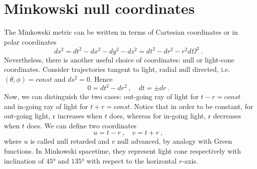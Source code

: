 \section{Minkowski null coordinates}

    The Minkowski metric can be written in terms of Cartesian coordinates or in polar coordinates 
    \begin{equation*}
        ds^2 = dt^2 - dx^2 - dy^2 - dz^2 = dt^2 - dr^2 - r^2 d\Omega^2 ~.
    \end{equation*}
    Nevertheless, there is another useful choice of coordinates: null or light-cone coordinates. Consider trajectories tangent to light, radial null directed, i.e.~$(\theta, \phi) = const$ and $ds^2 = 0$. Hence 
    \begin{equation*}
        0 = dt^2 - dr^2 ~, \quad dt = \pm dr ~.
    \end{equation*}
    Now, we can distinguish the two cases: out-going ray of light for $t - r = const$ and in-going ray of light for $t + r = const$. Notice that in order to be constant, for out-going light, r increases when $t$ does, whereas for in-going light, r decreases when $t$ does. We can define two coordinates 
    \begin{equation*}
        u = t - r ~, \quad v= t + r ~,
    \end{equation*}
    where $u$ is called null retarded and $v$ null advanced, by analogy with Green functions. In Minkowski spacetime, they represent light cone respectively with inclination of $45°$ and $135°$ with respect to the horizontal $r$-axis.

